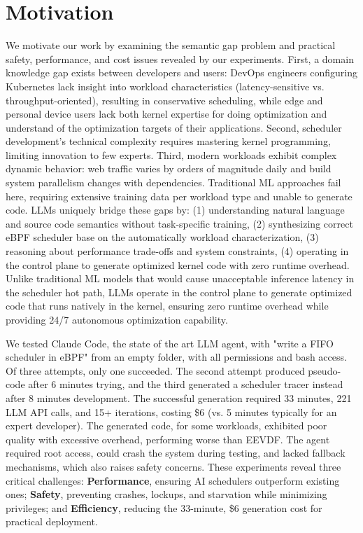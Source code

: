 \documentclass[preprint]{article}
\begin{document}
\section{Motivation}
\label{sec:motivation}

We motivate our work by examining the semantic gap problem and practical safety, performance, and cost issues revealed by our experiments. First, a domain knowledge gap exists between developers and users: DevOps engineers configuring Kubernetes lack insight into workload characteristics (latency-sensitive vs. throughput-oriented), resulting in conservative scheduling, while edge and personal device users lack both kernel expertise for doing optimization and understand of the optimization targets of their applications. Second, scheduler development's technical complexity requires mastering kernel programming, limiting innovation to few experts. Third, modern workloads exhibit complex dynamic behavior: web traffic varies by orders of magnitude daily and build system parallelism changes with dependencies. Traditional ML approaches fail here, requiring extensive training data per workload type and unable to generate code. LLMs uniquely bridge these gaps by: (1) understanding natural language and source code semantics without task-specific training, (2) synthesizing correct eBPF scheduler base on the automatically workload characterization, (3) reasoning about performance trade-offs and system constraints, (4) operating in the control plane to generate optimized kernel code with zero runtime overhead. Unlike traditional ML models that would cause unacceptable inference latency in the scheduler hot path, LLMs operate in the control plane to generate optimized code that runs natively in the kernel, ensuring zero runtime overhead while providing 24/7 autonomous optimization capability.


We tested Claude Code\cite{claudecode}, the state of the art LLM agent, with "write a FIFO scheduler in eBPF" from an empty folder, with all permissions and bash access. Of three attempts, only one succeeded. The second attempt produced pseudo-code after 6 minutes trying, and the third generated a scheduler tracer instead after 8 minutes development. The successful generation required 33 minutes, 221 LLM API calls, and 15+ iterations, costing \$6 (vs. 5 minutes typically for an expert developer). The generated code, for some workloads, exhibited poor quality with excessive overhead, performing worse than EEVDF. The agent required root access, could crash the system during testing, and lacked fallback mechanisms, which also raises safety concerns. These experiments reveal three critical challenges: \textbf{Performance}, ensuring AI schedulers outperform existing ones; \textbf{Safety}, preventing crashes, lockups, and starvation while minimizing privileges; and \textbf{Efficiency}, reducing the 33-minute, \$6 generation cost for practical deployment.
\end{document}
